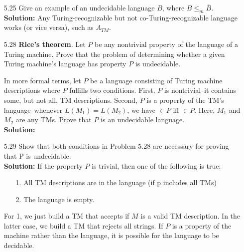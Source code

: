 \begin{enumerate}
\item[5.25]Give an example of an undecidable language $B$, where $B \le_{m} \overline{B}$.
\\
\textbf{Solution:} Any Turing-recognizable but not co-Turing-recognizable language works (or vice versa), such as $A_{TM}$.

\item[5.28]\textbf{Rice's theorem}. Let $P$ be any nontrivial property of the language of a Turing machine. Prove that the problem of determining whether a given Turing machine's language has property $P$ is undecidable.

\par In more formal terms, let $P$ be a language consisting of Turing machine descriptions where $P$ fulfills two conditions. First, $P$ is nontrivial--it contains some, but not all, TM descriptions. Second, $P$ is a property of the TM's language--whenever $L(M_1) = L(M_2)$, we have  $\in P$ iff  $\in P$. Here, $M_1$ and $M_2$ are any TMs. Prove that $P$ is an undecidable language.
\\
\textbf{Solution:} \alreadyanswered

\item[5.29]Show that both conditions in Problem 5.28 are necessary for proving that P is undecidable.
\\
\textbf{Solution:} If the property $P$ is trivial, then one of the following is true:
\begin{enumerate}
\item[1.]All TM descriptions are in the language (if p includes all TMs)
\item[2.]The language is empty. 
\end{enumerate}
For 1, we just build a TM that accepts if $M$ is a valid TM description. In the latter case, we build a TM that rejects all strings. If $P$ is a property of the machine rather than the language, it is possible for the language to be decidable.


\end{enumerate}
